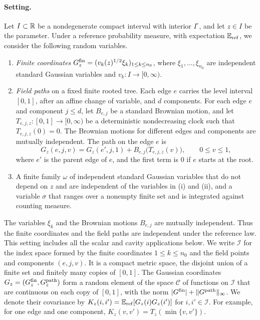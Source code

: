 \paragraph{Setting.}
Let $I\subset\mathbb R$ be a nondegenerate compact interval with interior $I^\circ$, and let
$z\in I$ be the parameter. Under a reference probability measure, with
expectation $\mathbb E_{\rm ref}$, we consider the following random
variables.
\begin{enumerate}[label=(\roman*)]
\item \emph{Finite coordinates}
$G^{\rm fin}_z=(v_k(z)^{1/2}\xi_k)_{1\le k\le n_0}$, where
$\xi_1,\ldots,\xi_{n_0}$ are independent standard Gaussian variables and
$v_k\colon I\to[0,\infty)$.
\item \emph{Field paths} on a fixed finite rooted tree. Each edge $e$
carries the level interval $[0,1]$, after an affine change of variable,
and $d$ components. For each edge $e$ and component $j\le d$, let
$B_{e,j}$ be a standard Brownian motion, and let
$T_{e,j,z}\colon[0,1]\to[0,\infty)$ be a deterministic nondecreasing clock
such that $T_{e,j,z}(0)=0$. The Brownian motions for different edges
and components are mutually independent. The path on the edge $e$ is
\[
 G_z(e,j,v)=G_z(e',j,1)+B_{e,j}\bigl(T_{e,j,z}(v)\bigr),
 \qquad 0\le v\le1,
\]
where $e'$ is the parent edge of $e$, and the first term is $0$ if $e$
starts at the root.
\item A finite family $\omega$ of independent standard Gaussian variables that do not
depend on $z$ and are independent of the variables in (i) and (ii), and
a variable $\sigma$ that ranges over a nonempty finite set and is integrated
against counting measure.
\end{enumerate}
The variables $\xi_k$ and the Brownian motions $B_{e,j}$ are mutually
independent. Thus the finite coordinates and the field paths are
independent under the reference law. This setting includes all the
scalar and cavity applications below.
We write $\mathcal I$ for the index space formed by the finite
coordinates $1\le k\le n_0$ and the field points and components
$(e,j,v)$. It is a compact metric space, the disjoint union of a finite
set and finitely many copies of $[0,1]$. The Gaussian coordinates
$G_z=(G_z^{\rm fin},G_z^{\rm path})$ form a random element of the space
$\mathcal C$ of functions on $\mathcal I$ that are continuous on each
copy of $[0,1]$, with the norm $|G^{\rm fin}|+\|G^{\rm path}\|_\infty$.
We denote their covariance by $K_z(i,i')=\mathbb E_{\rm ref}[G_z(i)G_z(i')]$ for
$i,i'\in\mathcal I$. For example, for one edge and one component,
$K_z(v,v')=T_z(\min\{v,v'\})$.


